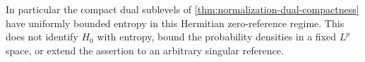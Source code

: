 In particular the compact dual sublevels of \cref{thm:normalization-dual-compactness} have uniformly bounded entropy in this Hermitian zero-reference regime. This does not identify $H_0$ with entropy, bound the probability densities in a fixed $L^p$ space, or extend the assertion to an arbitrary singular reference.
